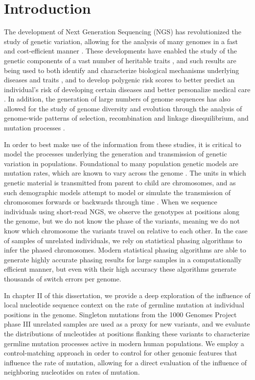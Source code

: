 \chapter{Introduction}
\label{chpt:introduction}

The development of Next Generation Sequencing (NGS) has revolutionized the study of genetic variation, allowing for the analysis of many genomes in a fast and cost-efficient manner \citep{Bagger2024}. These developments have enabled the study of the genetic components of a vast number of heritable traits \citep{Sollis2022, Szustakowski2021}, and such results are being used to both identify and characterize biological mechanisms underlying diseases and traits \citep{Gallagher2018}, and to develop polygenic risk scores to better predict an individual's risk of developing certain diseases and better personalize medical care \citep{Lewis2020}. In addition, the generation of large numbers of genome sequences has also allowed for the study of genome diversity and evolution through the analysis of genome-wide patterns of selection, recombination and linkage disequilibrium, and mutation processes \citep{Marchi2021}.

In order to best make use of the information from these studies, it is critical to model the processes underlying the generation and transmission of genetic variation in populations. Foundational to many population genetic models are mutation rates, which are known to vary across the genome \citep{Carlson2018, Aggarwala2016, Zhu2017}. The units in which genetic material is transmitted from parent to child are chromosomes, and as such demographic models attempt to model or simulate the transmission of chromosomes forwards or backwards through time \citep{Hanchard2006, Marchi2021, Sabeti2002}. When we sequence individuals using short-read NGS, we observe the genotypes at positions along the genome, but we do not know the phase of the variants, meaning we do not know which chromosome the variants travel on relative to each other. In the case of samples of unrelated individuals, we rely on statistical phasing algorithms to infer the phased chromosomes. Modern statistical phasing algorithms \citep{Browning2021, Hofmeister2023, Loh2016} are able to generate highly accurate phasing results for large samples in a computationally efficient manner, but even with their high accuracy these algorithms generate thousands of switch errors per genome. 

In chapter II of this dissertation, we provide a deep exploration of the influence of local nucleotide sequence context on the rate of germline mutation at individual positions in the genome. Singleton mutations from the 1000 Genomes Project phase III unrelated samples are used as a proxy for new variants, and we evaluate the distributions of nucleotides at positions flanking these variants to characterize germline mutation processes active in modern human populations.  We employ a control-matching approach in order to control for other genomic features that influence the rate of mutation, allowing for a direct evaluation of the influence of neighboring nucleotides on rates of mutation.

